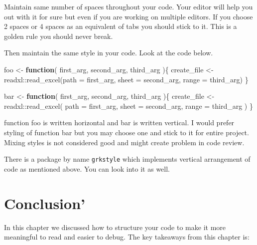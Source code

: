\documentclass[
]{book}
\newenvironment{Shaded}{\begin{snugshade}}{\end{snugshade}}
\newcommand{\AttributeTok}[1]{\textcolor[rgb]{0.77,0.63,0.00}{#1}}
\newcommand{\ControlFlowTok}[1]{\textcolor[rgb]{0.13,0.29,0.53}{\textbf{#1}}}
\newcommand{\FunctionTok}[1]{\textcolor[rgb]{0.00,0.00,0.00}{#1}}
\newcommand{\NormalTok}[1]{#1}
\newcommand{\OtherTok}[1]{\textcolor[rgb]{0.56,0.35,0.01}{#1}}
\newcommand{\SpecialCharTok}[1]{\textcolor[rgb]{0.00,0.00,0.00}{#1}}
\begin{document}
Maintain same number of spaces throughout your code. Your editor will help you out with it for sure but even if you are working on multiple editors. If you choose 2 spaces or 4 spaces as an equivalent of tabs you should stick to it. This is a golden rule you should never break.

Then maintain the same style in your code. Look at the code below.

\begin{Shaded}
\begin{Highlighting}[]
\NormalTok{foo }\OtherTok{\textless{}{-}} \ControlFlowTok{function}\NormalTok{(}
\NormalTok{  first\_arg, second\_arg, third\_arg}
\NormalTok{)\{}
\NormalTok{  create\_file }\OtherTok{\textless{}{-}}\NormalTok{ readxl}\SpecialCharTok{::}\FunctionTok{read\_excel}\NormalTok{(}\AttributeTok{path =}\NormalTok{ first\_arg, }\AttributeTok{sheet =}\NormalTok{ second\_arg, }
                                    \AttributeTok{range =}\NormalTok{ third\_arg)}
\NormalTok{\}}

\NormalTok{bar }\OtherTok{\textless{}{-}} \ControlFlowTok{function}\NormalTok{(}
\NormalTok{  first\_arg,}
\NormalTok{  second\_arg,}
\NormalTok{  third\_arg}
\NormalTok{)\{}
\NormalTok{  create\_file }\OtherTok{\textless{}{-}}\NormalTok{ readxl}\SpecialCharTok{::}\FunctionTok{read\_excel}\NormalTok{(}
    \AttributeTok{path =}\NormalTok{ first\_arg, }
    \AttributeTok{sheet =}\NormalTok{ second\_arg, }
    \AttributeTok{range =}\NormalTok{ third\_arg}
\NormalTok{    )}
\NormalTok{\}}
\end{Highlighting}
\end{Shaded}

function foo is written horizontal and bar is written vertical. I would prefer styling of function bar but you may choose one and stick to it for entire project. Mixing styles is not considered good and might create problem in code review.

There is a package by name \texttt{grkstyle} which implements vertical arrangement of code as mentioned above. You can look into it as well.

\hypertarget{conclusion-1}{%
\section{Conclusion'}\label{conclusion-1}}

In this chapter we discussed how to structure your code to make it more meaningful to read and easier to debug. The key takeaways from this chapter is:
\end{document}
